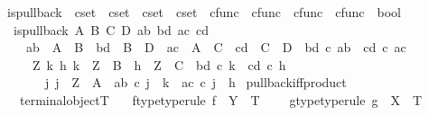 \begin{isabellebody}
\isamarkupfalse%
\ is{\isacharunderscore}{\kern0pt}pullback\ {\isacharcolon}{\kern0pt}{\isacharcolon}{\kern0pt}\ {\isachardoublequoteopen}cset\ {\isasymRightarrow}\ cset\ {\isasymRightarrow}\ cset\ {\isasymRightarrow}\ cset\ {\isasymRightarrow}\ cfunc\ {\isasymRightarrow}\ cfunc\ {\isasymRightarrow}\ cfunc\ {\isasymRightarrow}\ cfunc\ {\isasymRightarrow}\ bool{\isachardoublequoteclose}\ \isanewline
\ \ {\isachardoublequoteopen}is{\isacharunderscore}{\kern0pt}pullback\ A\ B\ C\ D\ ab\ bd\ ac\ cd\ {\isasymlongleftrightarrow}\ \isanewline
\ \ \ \ {\isacharparenleft}{\kern0pt}ab\ {\isacharcolon}{\kern0pt}\ A\ {\isasymrightarrow}\ B\ {\isasymand}\ bd\ {\isacharcolon}{\kern0pt}\ B\ {\isasymrightarrow}\ D\ {\isasymand}\ ac\ {\isacharcolon}{\kern0pt}\ A\ {\isasymrightarrow}\ C\ {\isasymand}\ cd\ {\isacharcolon}{\kern0pt}\ C\ {\isasymrightarrow}\ D\ {\isasymand}\ bd\ {\isasymcirc}\isactrlsub c\ ab\ {\isacharequal}{\kern0pt}\ cd\ {\isasymcirc}\isactrlsub c\ ac\ {\isasymand}\ \isanewline
\ \ \ \ {\isacharparenleft}{\kern0pt}{\isasymforall}\ Z\ k\ h{\isachardot}{\kern0pt}\ {\isacharparenleft}{\kern0pt}k\ {\isacharcolon}{\kern0pt}\ Z\ {\isasymrightarrow}\ B\ {\isasymand}\ h\ {\isacharcolon}{\kern0pt}\ Z\ {\isasymrightarrow}\ C\ {\isasymand}\ bd\ {\isasymcirc}\isactrlsub c\ k\ {\isacharequal}{\kern0pt}\ cd\ {\isasymcirc}\isactrlsub c\ h{\isacharparenright}{\kern0pt}\ \ {\isasymlongrightarrow}\isanewline
\ \ \ \ \ \ {\isacharparenleft}{\kern0pt}{\isasymexists}{\isacharbang}{\kern0pt}\ j{\isachardot}{\kern0pt}\ j\ {\isacharcolon}{\kern0pt}\ Z\ {\isasymrightarrow}\ A\ {\isasymand}\ ab\ {\isasymcirc}\isactrlsub c\ j\ {\isacharequal}{\kern0pt}\ k\ {\isasymand}\ ac\ {\isasymcirc}\isactrlsub c\ j\ {\isacharequal}{\kern0pt}\ h{\isacharparenright}{\kern0pt}{\isacharparenright}{\kern0pt}{\isacharparenright}{\kern0pt}{\isachardoublequoteclose}\isanewline
\isanewline
{}\isamarkupfalse%
\ pullback{\isacharunderscore}{\kern0pt}iff{\isacharunderscore}{\kern0pt}product{\isacharcolon}{\kern0pt}\isanewline
\ \ \ {\isachardoublequoteopen}terminal{\isacharunderscore}{\kern0pt}object{\isacharparenleft}{\kern0pt}T{\isacharparenright}{\kern0pt}{\isachardoublequoteclose}\isanewline
\ \ \ f{\isacharunderscore}{\kern0pt}type{\isacharbrackleft}{\kern0pt}type{\isacharunderscore}{\kern0pt}rule{\isacharbrackright}{\kern0pt}{\isacharcolon}{\kern0pt}\ {\isachardoublequoteopen}f\ {\isacharcolon}{\kern0pt}\ Y\ {\isasymrightarrow}\ T{\isachardoublequoteclose}\ \isanewline
\ \ \ g{\isacharunderscore}{\kern0pt}type{\isacharbrackleft}{\kern0pt}type{\isacharunderscore}{\kern0pt}rule{\isacharbrackright}{\kern0pt}{\isacharcolon}{\kern0pt}\ {\isachardoublequoteopen}g\ {\isacharcolon}{\kern0pt}\ X\ {\isasymrightarrow}\ T{\isachardoublequoteclose}\isanewline

\end{isabellebody}

